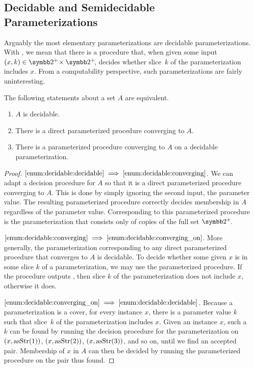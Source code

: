 \subsection{Decidable and Semidecidable Parameterizations}
\label{sec:computability:decidable}%
Arguably the most elementary parameterizations are decidable parameterizations.
With , we mean that there is a procedure that, when given some input $(x, k) \in \binary^+\! \times \binary^+\!$, decides whether slice~$k$ of the parameterization includes $x$.
From a computability perspective, such parameterizations are fairly uninteresting.
\begin{theorem}
\label{thm:decidable}%
  The following statements about a set $A$ are equivalent.
  \begin{enumerate}[series=enum:decidable]
  \item\label{enum:decidable:decidable}
    $A$ is decidable.
  \item\label{enum:decidable:converging}
    There is a direct parameterized procedure converging to $A$.
  \item\label{enum:decidable:converging_on}
    There is a parameterized procedure converging to $A$ on a decidable parameterization.
  \end{enumerate}
\end{theorem}
\begin{proof}
$\ref{enum:decidable:decidable} \implies \ref{enum:decidable:converging}$.
  We can adapt a decision procedure for $A$ so that it is a direct parameterized procedure converging to $A$.
  This is done by simply ignoring the second input, the parameter value.
  The resulting parameterized procedure correctly decides membership in $A$ regardless of the parameter value.
  Corresponding to this parameterized procedure is the parameterization that consists only of copies of the full set $\binary^+\!$.

$\ref{enum:decidable:converging} \implies \ref{enum:decidable:converging_on}$.
  More generally, the parameterization corresponding to any direct parameterized procedure that converges to $A$ is decidable.
  To decide whether some given $x$ is in some slice $k$ of a parameterization, we may use the parameterized procedure.
  If the procedure outputs , then slice $k$ of the parameterization does not include $x$, otherwise it does.

$\ref{enum:decidable:converging_on} \implies \ref{enum:decidable:decidable}$.
  Because a parameterization is a cover, for every instance $x$, there is a parameter value $k$ such that slice~$k$ of the parameterization includes $x$.
  Given an instance $x$, such a $k$ can be found by running the decision procedure for the parameterization on $(x, \operatorname{asStr}(1))$, $(x, \operatorname{asStr}(2))$, $(x, \operatorname{asStr}(3))$, and so on, until we find an accepted pair.
  Membership of $x$ in $A$ can then be decided by running the parameterized procedure on the pair thus found.
\end{proof}

